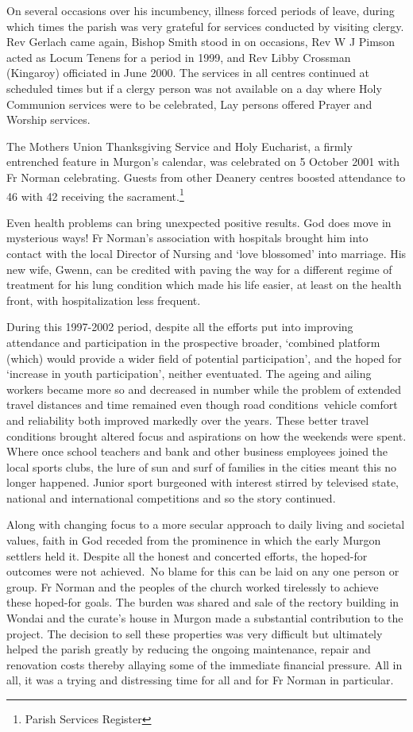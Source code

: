 On several occasions over his incumbency, illness forced periods of leave, during which times the parish was very grateful for services conducted by visiting clergy. Rev Gerlach came again, Bishop Smith stood in on occasions, Rev W J Pimson acted as Locum Tenens for a period in 1999, and Rev Libby Crossman (Kingaroy) officiated in June 2000. The services in all centres continued at scheduled times but if a clergy person was not available on a day where Holy Communion services were to be celebrated, Lay persons offered Prayer and Worship services.

The Mothers Union Thanksgiving Service and Holy Eucharist, a firmly entrenched feature in Murgon's calendar, was celebrated on 5 October 2001 with Fr Norman celebrating. Guests from other Deanery centres boosted attendance to 46 with 42 receiving the sacrament.\footnote{Parish Services Register}

Even health problems can bring unexpected positive results. God does move in mysterious ways! Fr Norman's association with hospitals brought him into contact with the local Director of Nursing and `love blossomed' into marriage. His new wife, Gwenn, can be credited with paving the way for a different regime of treatment for his lung condition which made his life easier, at least on the health front, with hospitalization less frequent.

During this 1997-2002 period, despite all the efforts put into improving attendance and participation in the prospective broader, `combined platform (which) would provide a wider field of potential participation', and the hoped for `increase in youth participation', neither eventuated. The ageing and ailing workers became more so and decreased in number while the problem of extended travel distances and time remained even though road conditions~vehicle comfort and reliability both improved markedly over the years. These better travel conditions brought altered focus and aspirations on how the weekends were spent. Where once school teachers and bank and other business employees joined the local sports clubs, the lure of sun and surf of families in the cities meant this no longer happened. Junior sport burgeoned with interest stirred by televised state, national and international competitions and so the story continued.

Along with changing focus to a more secular approach to daily living and societal values, faith in God receded from the prominence in which the early Murgon settlers held it. Despite all the honest and concerted efforts, the hoped-for outcomes were not achieved.~No blame for this can be laid on any one person or group. Fr Norman and the peoples of the church worked tirelessly to achieve these hoped-for goals. The burden was shared and sale of the rectory building in Wondai and the curate's house in Murgon made a substantial contribution to the project. The decision to sell these properties was very difficult but ultimately helped the parish greatly by reducing the ongoing maintenance, repair and renovation costs thereby allaying some of the immediate financial pressure. All in all, it was a trying and distressing time for all and for Fr Norman in particular.

